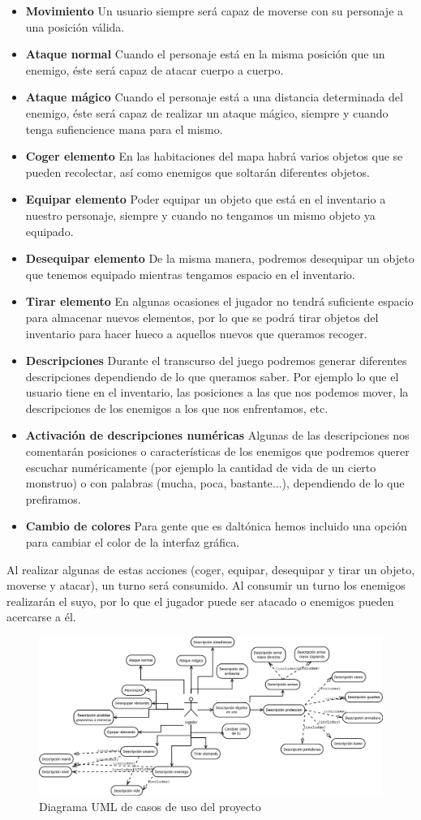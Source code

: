 \begin{itemize}
  \item \textbf{Movimiento} Un usuario siempre será capaz de moverse con su personaje a una posición válida. 
  \item \textbf{Ataque normal} Cuando el personaje está en la misma posición que un enemigo, éste será capaz de atacar cuerpo a cuerpo.
  \item \textbf{Ataque mágico} Cuando el personaje está a una distancia determinada del enemigo, éste será capaz de realizar un ataque mágico, siempre y cuando tenga sufiencience mana para el mismo.
  \item \textbf{Coger elemento} En las habitaciones del mapa habrá varios objetos que se pueden recolectar, así como enemigos que soltarán diferentes objetos.
  \item \textbf{Equipar elemento} Poder equipar un objeto que está en el inventario a nuestro personaje, siempre y cuando no tengamos un mismo objeto ya equipado.
  \item \textbf{Desequipar elemento} De la misma manera, podremos desequipar un objeto que tenemos equipado mientras tengamos espacio en el inventario.
  \item \textbf{Tirar elemento} En algunas ocasiones el jugador no tendrá suficiente espacio para almacenar nuevos elementos, por lo que se podrá tirar objetos del inventario para hacer hueco a aquellos nuevos que queramos recoger.
  \item \textbf{Descripciones} Durante el transcurso del juego podremos generar diferentes descripciones dependiendo de lo que queramos saber. Por ejemplo lo que el usuario tiene en el inventario, las posiciones a las que nos podemos mover, la descripciones de los enemigos a los que nos enfrentamos, etc.
  \item \textbf{Activación de descripciones numéricas} Algunas de las descripciones nos comentarán posiciones o características de los enemigos que podremos querer escuchar numéricamente (por ejemplo la cantidad de vida de un cierto monstruo) o con palabras (mucha, poca, bastante...), dependiendo de lo que prefiramos.
  \item \textbf{Cambio de colores} Para gente que es daltónica hemos incluido una opción para cambiar el color de la interfaz gráfica.
\end{itemize}

Al realizar algunas de estas acciones (coger, equipar, desequipar y tirar un objeto, moverse y atacar), un turno será consumido. Al consumir un turno los enemigos realizarán el suyo, por lo que el jugador puede ser atacado o enemigos pueden acercarse a él.

\begin{figure}[h!]
    \centering
    \includegraphics[width=0.9\textheight,angle=90]{img/casosdeuso.png}
    \caption{Diagrama UML de casos de uso del proyecto}
    \label{fig:casosdeuso}
\end{figure}
